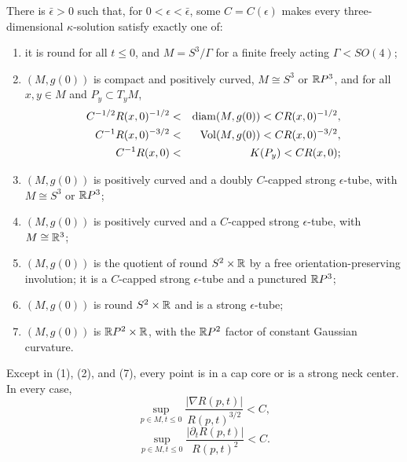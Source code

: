 \begin{theorem}\label{thm:kappa-solution-structure-summary}
\label{kappasummary}

There is $\bar\epsilon>0$ such that, for
$0<\epsilon<\bar\epsilon$, some $C=C(\epsilon)$ makes every
three-dimensional $\kappa$-solution satisfy exactly one of:
\begin{enumerate}
\item[(1)] it is round for all $t\leq0$, and $M=S^3/\Gamma$ for a
finite freely acting $\Gamma<SO(4)$;
\item[(2)] $(M,g(0))$ is compact and positively curved,
$M\cong S^3$ or $\mathbb{R} P^3$, and for all $x,y\in M$ and
$P_y\subset T_yM$,
\begin{eqnarray*}
 C^{-1/2}R(x,0)^{-1/2}&<&\operatorname{diam}(M,g(0))<CR(x,0)^{-1/2},\\
 C^{-1}R(x,0)^{-3/2}&<&\operatorname{Vol}(M,g(0))<CR(x,0)^{-3/2},\\
 C^{-1}R(x,0)&<&K(P_y)<CR(x,0);
\end{eqnarray*}
\item[(3)] $(M,g(0))$ is positively curved and a doubly
$C$-capped strong $\epsilon$-tube, with
$M\cong S^3$ or $\mathbb{R} P^3$;
\item[(4)] $(M,g(0))$ is positively curved and a $C$-capped strong
$\epsilon$-tube, with $M\cong\mathbb{R}^3$;
\item[(5)] $(M,g(0))$ is the quotient of round
$S^2\times\mathbb{R}$ by a free orientation-preserving involution; it is a
$C$-capped strong $\epsilon$-tube and a punctured $\mathbb{R} P^3$;
\item[(6)] $(M,g(0))$ is round $S^2\times\mathbb{R}$ and is a strong
$\epsilon$-tube;
\item[(7)] $(M,g(0))$ is $\mathbb{R} P^2\times\mathbb{R}$, with the
$\mathbb{R} P^2$ factor of constant Gaussian curvature.
\end{enumerate}
Except in (1), (2), and (7), every point is in a cap core or is a
strong neck center. In every case,
\begin{equation}\label{nablaR}
 \sup_{p\in M,t\leq0}\frac{|\nabla R(p,t)|}{R(p,t)^{3/2}}<C,
\end{equation}
\begin{equation}\label{dRdt}
 \sup_{p\in M,t\leq0}\frac{|\partial_tR(p,t)|}{R(p,t)^2}<C.
\end{equation}
\end{theorem}

